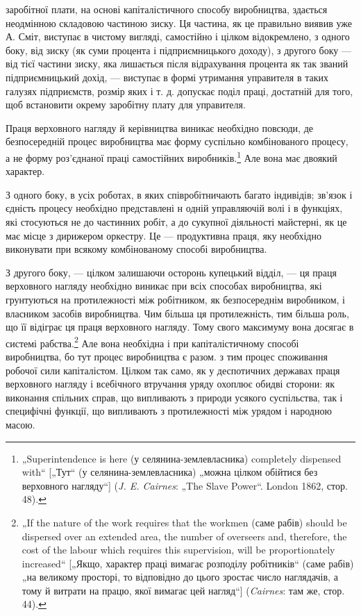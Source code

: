 \parcont{}  %
заробітної плати, на основі капіталістичного способу виробництва,
здається неодмінною складовою частиною зиску. Ця частина, як
це правильно виявив уже А. Сміт, виступає в чистому вигляді,
самостійно і цілком відокремлено, з одного боку, від зиску (як
суми процента і підприємницького доходу), з другого боку —
від тієї частини зиску, яка лишається після відрахування процента
як так званий підприємницький дохід, — виступає в формі утримання
управителя в таких галузях підприємств, розмір яких
і т. д. допускає поділ праці, достатній для того, щоб встановити
окрему заробітну плату для управителя.

Праця верховного нагляду й керівництва виникає необхідно
повсюди, де безпосередній процес виробництва має форму суспільно
комбінованого процесу, а не форму роз’єднаної праці
самостійних виробників.\footnote{
„Superintendence is here (у селянина-землевласника) completely dispensed
with“ [„Тут“ (у селянина-землевласника) „можна цілком обійтися без верховного
нагляду“] (\emph{J. E. Cairnes}: „The Slave Power“. London 1862, стор. 48).
} Але вона має двоякий характер.

З одного боку, в усіх роботах, в яких співробітничають багато
індивідів; зв’язок і єдність процесу необхідно представлені н
одній управляючій волі і в функціях, які стосуються не до частинних
робіт, а до сукупної діяльності майстерні, як це має місце
з дирижером оркестру. Це — продуктивна праця, яку необхідно
виконувати при всякому комбінованому способі виробництва.

З другого боку, — цілком залишаючи осторонь купецький
відділ, — ця праця верховного нагляду необхідно виникає при
всіх способах виробництва, які грунтуються на протилежності
між робітником, як безпосереднім виробником, і власником засобів
виробництва. Чим більша ця протилежність, тим більша
роль, що її відіграє ця праця верховного нагляду. Тому свого
максимуму вона досягає в системі рабства.\footnote{
„If the nature of the work requires that the workmen (саме рабів) should
be dispersed over an extended area, the number of overseers and, therefore, the
cost of the labour which requires this supervision, will be proportionately increased“
[„Якщо, характер праці вимагає розподілу робітників“ (саме рабів) „на
великому просторі, то відповідно до цього зростає число наглядачів, а тому й
витрати на працю, якої вимагає цей нагляд“] (\emph{Cairnes}: там же, стор. 44).
} Але вона необхідна
і при капіталістичному способі виробництва, бо тут процес
виробництва є разом. з тим процес споживання робочої
сили капіталістом. Цілком так само, як у деспотичних державах
праця верховного нагляду і всебічного втручання уряду
охоплює обидві сторони: як виконання спільних справ, що випливають
з природи усякого суспільства, так і специфічні функції,
що випливають з протилежності між урядом і народною
масою.

